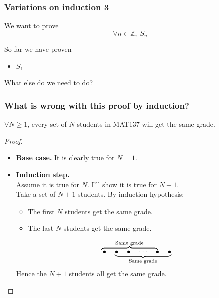 \documentclass[14pt]{beamer}
\begin{document}
\begin{frame}
	\frametitle{Variations on induction 3}

	We want to prove
	\[
		\forall n \in \mathbb{Z}, \; S_{n}
	\]

	\vfill

	So far we have proven
	\begin{itemize}
		\item $S_{1}$
	\end{itemize}

	\vfill

	What else do we need to do?
\end{frame}

\begin{frame}
	\frametitle{What is wrong with this proof by induction?}
	\fontsize{13}{13}\selectfont

	\vspace{-1.5mm}
	\begin{theorem}
		$\forall N \geq 1$, every set of $N$ students in MAT137 will get the same
		grade.
	\end{theorem}
	\vspace{-1mm}

	\begin{proof}
		\begin{itemize}
			\item {\bfseries Base case.} It is clearly true for $N=1$.

			\item {\bfseries Induction step.} \\ Assume it is true for $N$. I'll show
				it is true for $N+1$. \\ Take a set of $N+1$ students. By induction
				hypothesis:
				\begin{itemize}
					\item The first $N$ students get the same grade.

					\item The last $N$ students get the same grade.
				\end{itemize}
				\[
					\mathrlap{\overbrace{\phantom{\bullet \quad \bullet \quad \cdots \quad
					\bullet \quad \bullet }}^{\text{Same grade}}}\bullet \quad \underbrace{\bullet
					\quad \bullet \quad \cdots \quad \bullet \quad \bullet}_{\text{Same
					grade}}
				\]
				Hence the $N+1$ students all get the same grade.
		\end{itemize}
	\end{proof}
\end{frame}
\end{document}
